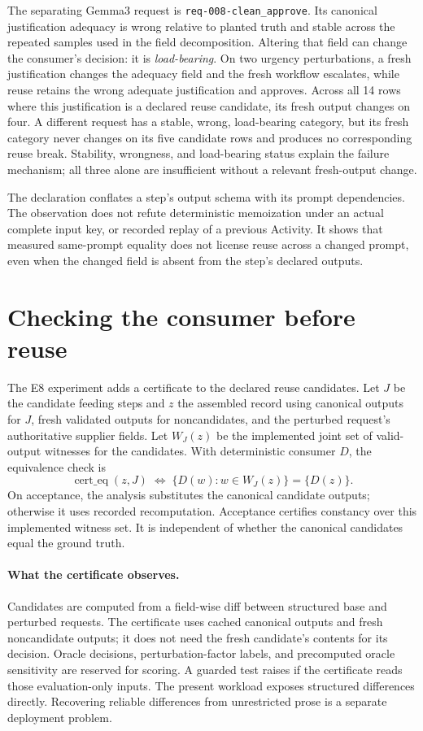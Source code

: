 The separating Gemma3 request is \texttt{req-008-\allowbreak clean\_\allowbreak approve}. Its canonical justification adequacy is wrong relative to planted truth and stable across the repeated samples used in the field decomposition. Altering that field can change the consumer's decision: it is \emph{load-bearing}. On two urgency perturbations, a fresh justification changes the adequacy field and the fresh workflow escalates, while reuse retains the wrong adequate justification and approves. Across all 14 rows where this justification is a declared reuse candidate, its fresh output changes on four. A different request has a stable, wrong, load-bearing category, but its fresh category never changes on its five candidate rows and produces no corresponding reuse break. Stability, wrongness, and load-bearing status explain the failure mechanism; all three alone are insufficient without a relevant fresh-output change.

The declaration conflates a step's output schema with its prompt dependencies. The observation does not refute deterministic memoization under an actual complete input key, or recorded replay of a previous Activity. It shows that measured same-prompt equality does not license reuse across a changed prompt, even when the changed field is absent from the step's declared outputs.

\section{Checking the consumer before reuse}
\label{sec:certificate}
The E8 experiment adds a certificate to the declared reuse candidates. Let $J$ be the candidate feeding steps and $z$ the assembled record using canonical outputs for $J$, fresh validated outputs for noncandidates, and the perturbed request's authoritative supplier fields. Let $W_J(z)$ be the implemented joint set of valid-output witnesses for the candidates. With deterministic consumer $D$, the equivalence check is
\begin{equation}
\operatorname{cert\_eq}(z,J)\;\Longleftrightarrow\;
 \{D(w):w\in W_J(z)\}=\{D(z)\}.
\label{eq:certificate}
\end{equation}
On acceptance, the analysis substitutes the canonical candidate outputs; otherwise it uses recorded recomputation. Acceptance certifies constancy over this implemented witness set. It is independent of whether the canonical candidates equal the ground truth.

\paragraph{What the certificate observes.}
Candidates are computed from a field-wise diff between structured base and perturbed requests. The certificate uses cached canonical outputs and fresh noncandidate outputs; it does not need the fresh candidate's contents for its decision. Oracle decisions, perturbation-factor labels, and precomputed oracle sensitivity are reserved for scoring. A guarded test raises if the certificate reads those evaluation-only inputs. The present workload exposes structured differences directly. Recovering reliable differences from unrestricted prose is a separate deployment problem.

